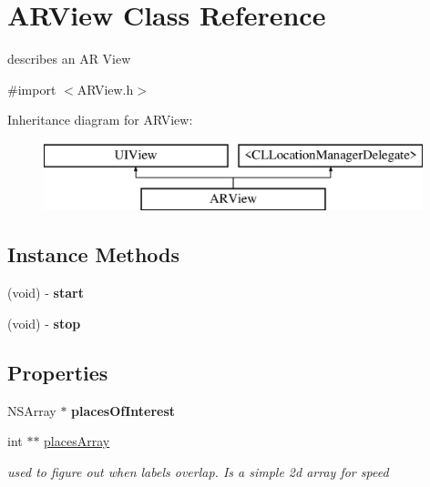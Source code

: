 \hypertarget{interface_a_r_view}{\section{A\-R\-View Class Reference}
\label{interface_a_r_view}
}


describes an A\-R View  




{\ttfamily \#import $<$A\-R\-View.\-h$>$}

Inheritance diagram for A\-R\-View\-:\begin{figure}[H]
\begin{center}
\leavevmode
\includegraphics[height=2.000000cm]{interface_a_r_view}
\end{center}
\end{figure}
\subsection*{Instance Methods}
\begin{DoxyCompactItemize}
\item 
\hypertarget{interface_a_r_view_a60de64d75454385b23995437f1d72669}{(void) -\/ {\bfseries start}}\label{interface_a_r_view_a60de64d75454385b23995437f1d72669}

\item 
\hypertarget{interface_a_r_view_a8c528baf37154d347366083f0f816846}{(void) -\/ {\bfseries stop}}\label{interface_a_r_view_a8c528baf37154d347366083f0f816846}

\end{DoxyCompactItemize}
\subsection*{Properties}
\begin{DoxyCompactItemize}
\item 
\hypertarget{interface_a_r_view_a4e6a6579b7723db31498ffb829a57373}{N\-S\-Array $\ast$ {\bfseries places\-Of\-Interest}}\label{interface_a_r_view_a4e6a6579b7723db31498ffb829a57373}

\item 
\hypertarget{interface_a_r_view_a8abde916669147c4dd3350393e7ae243}{int $\ast$$\ast$ \hyperlink{interface_a_r_view_a8abde916669147c4dd3350393e7ae243}{places\-Array}}\label{interface_a_r_view_a8abde916669147c4dd3350393e7ae243}

\begin{DoxyCompactList}\small\item\em used to figure out when labels overlap. Is a simple 2d array for speed \end{DoxyCompactList}\end{DoxyCompactItemize}


